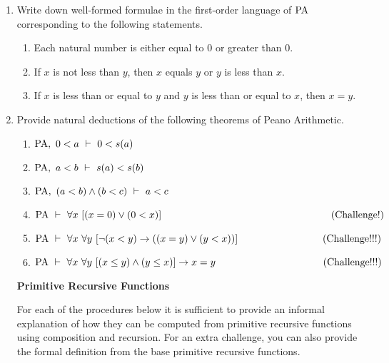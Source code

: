 \documentclass[11pt]{report}
\begin{document}
\begin{enumerate}

	\item Write down well-formed formulae in the first-order language of $\text{PA}$ corresponding to the following statements. 
	
		\begin{enumerate}
			\item Each natural number is either equal to $0$ or greater than $0$. 			
			\item If $x$ is not less than $y$, then $x$ equals $y$ or $y$ is less than $x$.
			\item If $x$ is less than or equal to $y$ and $y$ is less than or equal to $x$, then $x=y$. 
		\end{enumerate}
	 
	\item Provide natural deductions of the following theorems of Peano Arithmetic.
	
		\begin{enumerate}
			\item $\text{PA} , \ 0 < a \ \vdash \ 0 < s(a)$
			\item $\text{PA} , \ a < b \ \vdash \ s(a) < s(b)$
			\item $\PA , \ (a < b) \land (b < c) \ \vdash \ a < c$
			\item $\PA \ \vdash \ \forall x \ [(x = 0) \lor (0 < x)] \hspace{6cm} \text{(Challenge!)}$
			\item $\PA \ \vdash \ \forall x \ \forall y \ [\lnot(x<y) \to ((x=y) \lor (y<x))] \hspace{3cm} \text{(Challenge!!!)}$
			\item $\PA \ \vdash \ \forall x \ \forall y \ [(x\leq y) \land (y\leq x)] \to x=y \hspace{3.8cm} \text{(Challenge!!!)}$
		\end{enumerate}

		\vspace{0.5cm}
		\begin{center}
			{\bf Primitive Recursive Functions}
		\end{center}

		For each of the procedures below it is sufficient to provide an informal explanation of how they can be computed from primitive recursive functions using composition and recursion. For an extra challenge, you can also provide the formal definition from the base primitive recursive functions. 


\end{enumerate}
\end{document}
